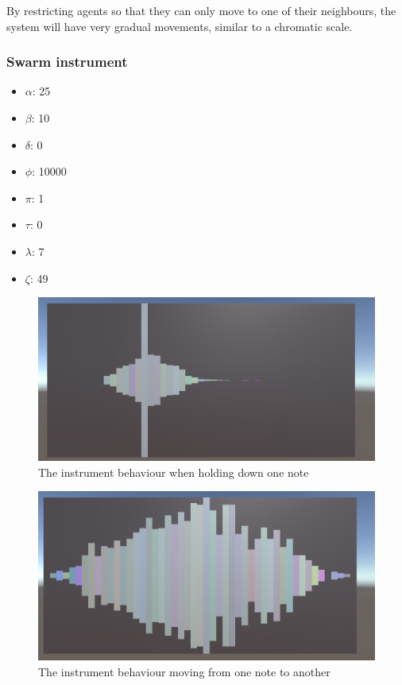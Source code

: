 \documentclass[a4paper,english]{report}
\begin{document}
	By restricting agents so that they can only move to one of their neighbours, the system will have very gradual movements, similar to a chromatic scale.
	
	
	\subsubsection{Swarm instrument}
	\begin{samepage}\begin{itemize}
		\item $\alpha$: 25
		\item $\beta$: 10
		\item $\delta$: 0
		\item $\phi$: 10000
		\item $\pi$: 1
		\item $\tau$: 0
		\item $\lambda$: 7
		\item $\zeta$: 49
	\end{itemize}\end{samepage}
	\begin{figure}
		\centering
		\includegraphics[width=1\linewidth]{instrument}
		\caption{The instrument behaviour when holding down one note}
		\label{fig:swarminst}
	\end{figure}
	\begin{figure}
		\centering
		\includegraphics[width=1\linewidth]{instrument_move}
		\caption{The instrument behaviour moving from one note to another}
		\label{fig:swarmmove}
	\end{figure}
	
\end{document}
